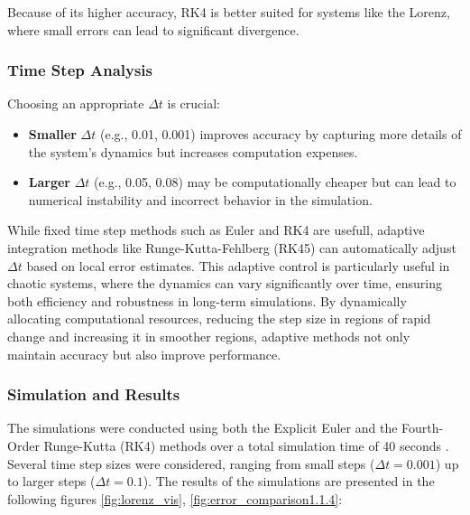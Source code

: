 


Because of its higher accuracy, RK4 is better suited for systems like the Lorenz, where small errors can lead to significant divergence.

\subsubsection{Time Step Analysis}

Choosing an appropriate $\Delta t$ is crucial:

\begin{itemize}
    \item \textbf{Smaller} $\Delta t$ (e.g., 0.01, 0.001) improves accuracy by capturing more details of the system’s dynamics but increases computation expenses.
    \item \textbf{Larger} $\Delta t$ (e.g., 0.05, 0.08) may be computationally cheaper but can lead to numerical instability and incorrect behavior in the simulation.
\end{itemize}
While fixed time step methods such as Euler and RK4 are usefull, adaptive integration methods like Runge-Kutta-Fehlberg (RK45) can automatically adjust $\Delta t$ based on local error estimates. This adaptive control is particularly useful in chaotic systems, where the dynamics can vary significantly over time, ensuring both efficiency and robustness in long-term simulations. By dynamically allocating computational resources, reducing the step size in regions of rapid change and increasing it in smoother regions, adaptive methods not only maintain accuracy but also improve performance.


\subsubsection{Simulation and Results}
The simulations were conducted using both the Explicit Euler and the Fourth-Order Runge-Kutta (RK4) methods over a total simulation time of 40 seconds \cite{youngaryanLorenzPlot1.1.4}. Several time step sizes were considered, ranging from small steps ($\Delta t = 0.001$) up to larger steps ($\Delta t = 0.1$). The results of the simulations are presented in the following figures \ref{fig:lorenz_vis}, \ref{fig:error_comparison1.1.4}:


